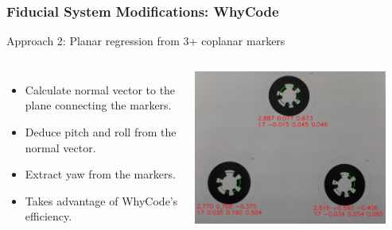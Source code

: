 \documentclass[aspectratio=169]{rubeamer}
\begin{document}
\begin{frame}
  \frametitle{Fiducial System Modifications: WhyCode}
  Approach 2: Planar regression from 3+ coplanar markers

  \begin{columns}
    \begin{itemize}
      \item Calculate normal vector to the plane connecting the markers.
      \item Deduce pitch and roll from the normal vector.
      \item Extract yaw from the markers.
      \item Takes advantage of WhyCode's efficiency.
    \end{itemize}
    \centering
    \includegraphics[width=0.9\textwidth]{cropped_whycode_3_8_jiri_example}
  \end{columns}
\end{frame}
\end{document}
